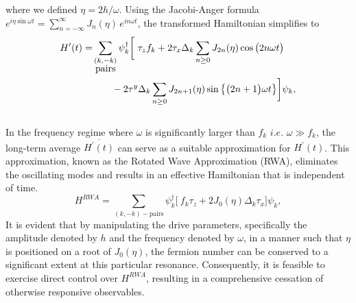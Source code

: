 \documentclass[%
reprint,
superscriptaddress,
amsmath,amssymb,
aps,
prb,
showkeys,
]{revtex4-2}
\begin{document}
	where we defined $\eta=2h/\omega$. Using the Jacobi-Anger formula $e^{i \eta \sin{\omega t}} = \sum_{n=-\infty}^{\infty} J_n(\eta)\, e^{i n \omega t}$, the transformed Hamiltonian simplifies to \\
	\begin{align}
		H^\prime(t) =& \sum_{\substack{(k,-k) \\ \mbox{pairs}}} \psi^\dagger_k
		\bigg[\ \tau_z f_k + 2\tau_x \Delta_k \sum_{n\geq 0} J_{2n}(\eta)\cos{\big(2n\omega t\big)} \nonumber\\
		&\hskip 0.7cm- 2\tau^y\Delta_k \sum_{n\geq 0} J_{2n+1}(\eta)\sin{\big\{\big(2n+1\big)\omega t\big\}}   \bigg]\psi_k,
	\end{align}\\
	In the frequency regime where $\omega$ is significantly larger than $f_k$ $i.e.$  $\omega \gg f_k$, the long-term average $\overline{H^\prime(t)}$ can serve as a suitable approximation for $H^\prime(t)$. This approximation, known as the Rotated Wave Approximation (RWA), eliminates the oscillating modes and results in an effective Hamiltonian that is independent of time.
	\begin{equation}
		\label{eq:hrwa:tfim}
		H^{RWA} = \sum_{(k,-k)-\mbox{pairs}} \psi^\dagger_k
		\bigg[\ f_k\tau_z + 2 J_0(\eta) \Delta_k\tau_x \bigg]\psi_k,
	\end{equation}
	It is evident that by manipulating the drive parameters, specifically the amplitude denoted by $h$ and the frequency denoted by $\omega$, in a manner such that $\eta$ is positioned on a root of $J_0(\eta)$, the fermion number can be conserved to a significant extent at this particular resonance. Consequently, it is feasible to exercise direct control over $H^{RWA}$, resulting in a comprehensive cessation of otherwise responsive observables. 
	
\end{document}
